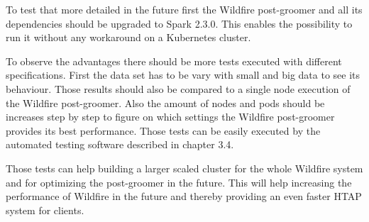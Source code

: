 To test that more detailed in the future first the Wildfire post-groomer and all its dependencies should be upgraded to Spark 2.3.0. This enables the possibility to run it without any workaround on a Kubernetes cluster.

To observe the advantages there should be more tests executed with different specifications. First the data set has to be vary with small and big data to see its behaviour. Those results should also be compared to a single node execution of the Wildfire post-groomer. Also the amount of nodes and pods should be increases step by step to figure on which settings the Wildfire post-groomer provides its best performance. Those tests can be easily executed by the automated testing software described in chapter 3.4.

Those tests can help building a larger scaled cluster for the whole Wildfire system and for optimizing the post-groomer in the future. This will help increasing the performance of Wildfire in the future and thereby providing an even faster HTAP system for clients.